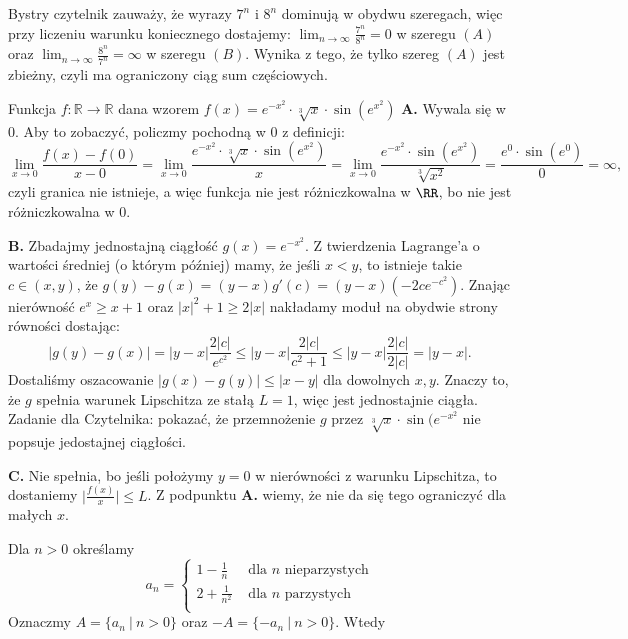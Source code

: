 \begin{solutions}
    Bystry czytelnik zauważy, że wyrazy $7^n$ i $8^n$ dominują w obydwu szeregach, więc przy liczeniu warunku koniecznego dostajemy:
    $\lim_{n\to\infty}\frac{7^n}{8^n}=0$ w szeregu $(A)$ oraz $\lim_{n\to\infty}\frac{8^n}{7^n}=\infty$ w szeregu $(B)$. Wynika z tego, że tylko szereg $(A)$ jest zbieżny, czyli ma ograniczony ciąg sum częściowych.
    
    \sol Funkcja $\textit{f}: \mathbb{R} \xrightarrow{} \mathbb{R}$ dana wzorem $f(x) = e^{-x^2} \cdot \sqrt[3]{x} \cdot \sin(e^{x^2})$
    \textbf{A.} Wywala się w 0. Aby to zobaczyć, policzmy pochodną w 0 z definicji:
    $$
    \lim_{x\to0}\frac{f(x)-f(0)}{x-0} = \lim_{x\to0}\frac{e^{-x^2}\cdot\sqrt[3]{x}\cdot\sin(e^{x^2})}{x} = \lim_{x\to0}\frac{e^{-x^2}\cdot\sin(e^{x^2})}{\sqrt[3]{x^2}} = \frac{e^0\cdot\sin(e^0)}{0} = \infty,
    $$
    czyli granica nie istnieje, a więc funkcja nie jest różniczkowalna w $\RR$, bo nie jest różniczkowalna w 0.

    \textbf{B.} Zbadajmy jednostajną ciągłość $g(x)=e^{-x^2}$. Z twierdzenia Lagrange'a o wartości średniej (o którym później) mamy, że jeśli $x<y$, to istnieje takie $c\in(x,y)$, że $g(y)-g(x)=(y-x)g'(c)=(y-x)(-2ce^{-c^2})$. Znając nierówność $e^x\geq x+1$ oraz $|x|^2+1\geq 2|x|$ nakładamy moduł na obydwie strony równości dostając:
    $$
    |g(y)-g(x)| = |y-x|\frac{2|c|}{e^{c^2}} \leq |y-x|\frac{2|c|}{c^2+1} \leq |y-x|\frac{2|c|}{2|c|} = |y-x|.
    $$
    Dostaliśmy oszacowanie $|g(x)-g(y)|\leq|x-y|$ dla dowolnych $x,y$. Znaczy to, że $g$ spełnia warunek Lipschitza ze stałą $L=1$, więc jest jednostajnie ciągła. Zadanie dla Czytelnika: pokazać, że przemnożenie $g$ przez $\sqrt[3]{x}\cdot\sin(e^{-x^2}$ nie popsuje jedostajnej ciągłości.

    \textbf{C.} Nie spełnia, bo jeśli położymy $y=0$ w nierówności z warunku Lipschitza, to dostaniemy $\big|\frac{f(x)}{x}\big|\leq L$. Z podpunktu \textbf{A.} wiemy, że nie da się tego ograniczyć dla małych $x$.

    \sol Dla $n > 0$ określamy
    $$ a_n = 
    \begin{cases}
        1 - \frac{1}{n} & \text{ dla } n \text{ nieparzystych} \\
        2 + \frac{1}{n^2} & \text{ dla } n \text{ parzystych} \\
    \end{cases}
    $$
    Oznaczmy $A = \{ a_n \ | \ n > 0 \}$ oraz $-A = \{-a_n \ | \ n > 0\}$. Wtedy


\end{solutions}
